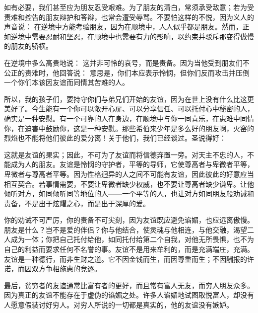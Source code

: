 如有必要，我们甚至应为朋友忍受艰难。为了朋友的清白，常须承受敌意；若为受责难和控告的朋友辩护和答辩，也常会遭受辱骂。不要怕这样的不悦，因为义人的声音说： 在逆境中方能考验朋友，因为在顺境中，人人似乎都是朋友。然而，正如逆境中需要忍耐和坚忍，在顺境中也需要有力的影响，以约束并驳斥那变得傲慢的朋友的骄横。\par

在逆境中多么高贵地说： 这并非可怜的哀号，而是责备。因为当他受到朋友们不公正的责难时，他回答说： 意思是，你们本应表示怜悯，但你们反而攻击并压倒一个你们本该因友谊而同情其苦难的人。\par

所以，我的孩子们，要持守你们与弟兄们开始的友谊，因为在世上没有什么比这更美好了。今生能有一个你可以敞开心扉、可以分享信任、可以托付心中秘密的人，确实是一种安慰。有一个可靠的人在身边，在顺境中与你一同喜乐，在患难中同情你，在迫害中鼓励你，这是一种安慰。那些希伯来少年是多么好的朋友啊，火窑的烈焰也不能将他们彼此的爱分离！关于他们，我们已经谈过。圣说得好：\par

这就是友谊的果实；因此，不可为了友谊而将信德弃置一旁。对天主不忠的人，不能成为人的朋友。友谊是怜悯的守护者，平等的导师，它使尊高者与卑微者平等，卑微者与尊高者平等。因为性格迥异的人之间不可能有友谊，因此彼此的好意应当相互契合。若事情需要，不要让卑微者缺少权威，也不要让尊高者缺少谦卑。让他倾听对方，如同倾听同等地位的人——一个平等的人，也让对方如同朋友般劝诫和责备，不是出于炫耀之心，而是出于深厚的爱。\par

你的劝诫不可严厉，你的责备不可尖刻，因为友谊既应避免谄媚，也应远离傲慢。朋友是什么？岂不是爱的伴侣？你与他结合，使灵魂与他相连，与他交融，渴望二人成为一体；你把自己托付给他，如同托付给第二个自我，对他无所畏惧，也不为自己的利益而要求任何不名誉的事。友谊不是用来牟利的，而是充满端庄，充满。友谊是一种德行，而非生财之道。它不因金钱而生，而因尊重而生；不因酬报的许诺，而因双方争相施惠的竞逐。\par

最后，贫穷者的友谊通常比富有者的更好，而且常有富人无友，而穷人朋友众多。因为真正的友谊不能存在于虚伪的谄媚之处。许多人谄媚地试图取悦富人，却没有人愿意假装讨好穷人。对穷人所说的一切都是真实的，他的友谊没有嫉妒。\par

